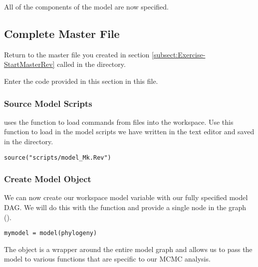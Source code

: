 All of the components of the model are now specified. \par

\subsection{Complete Master \Rev File}\label{subsect:Exercise-CompleteMCMC}

{\begin{framed}
Return to the master \Rev file you created in section \ref{subsect:Exercise-StartMasterRev} called {\textcolor{red}{}} in the  directory.

Enter the \Rev code provided in this section in this file.
\end{framed}}

\medskip
\subsubsection{Source Model Scripts}\label{subsub:Exercise-SourceMods}

\RevBayes uses the  function to load commands from \Rev files into the workspace.
Use this function to load in the model scripts we have written in the text editor and saved in the  directory.
{\tt \begin{snugshade*}
\begin{lstlisting}
source("scripts/model_Mk.Rev")

\end{lstlisting}
\end{snugshade*}}


\medskip
\subsubsection{Create Model Object}\label{subsub:Exercise-ModObj}

We can now create our workspace model variable with our fully specified model DAG. 
We will do this with the  function and provide a single node in the graph ().
{\tt \begin{snugshade*}
\begin{lstlisting}
mymodel = model(phylogeny)
\end{lstlisting}
\end{snugshade*}}

The object  is a wrapper around the entire model graph and allows us to pass the model to various functions that are specific to our MCMC analysis.

